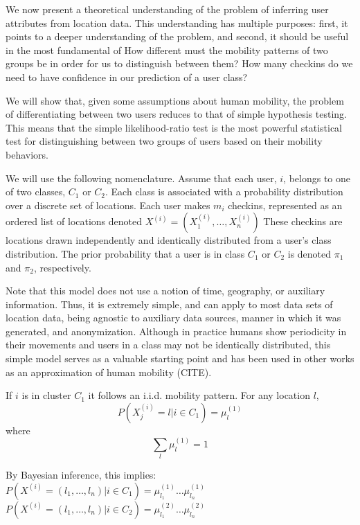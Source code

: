 We now present a theoretical understanding of the problem of inferring user attributes from location data.
This understanding has multiple purposes: first, it points to a deeper understanding of the problem, and second, it should be useful in the most fundamental of 
How different must the mobility patterns of two groups be in order for us to distinguish between them?
How many checkins do we need to have confidence in our prediction of a user class?

We will show that, given some assumptions about human mobility, the problem of differentiating between two users reduces to that of simple hypothesis testing. This means that the simple likelihood-ratio test is the most powerful statistical test for distinguishing between two groups of users based on their mobility behaviors.

We will use the following nomenclature. 
Assume that each user, $i$, belongs to one of two classes, $C_1$ or $C_2$. 
Each class is associated with a probability distribution over a discrete set of locations.
Each user makes $m_i$ checkins, represented as an ordered list of locations denoted $X^{(i)}=(X^{(i)}_1,\ldots,X^{(i)}_n)$
These checkins are locations drawn independently and identically distributed from a user's class distribution.
The prior probability that a user is in class $C_1$ or $C_2$ is denoted $\pi_1$ and $\pi_2$, respectively.

Note that this model does not use a notion of time, geography, or auxiliary information.
Thus, it is extremely simple, and can apply to most data sets of location data, being agnostic to
  auxiliary data sources, manner in which it was generated, and anonymization.
Although in practice humans show periodicity in their movements and users in a class may not be 
  identically distributed, this simple model serves as a valuable starting point and 
  has been used in other works as an approximation of human mobility (CITE).

If $i$ is in cluster $C_1$ it follows an i.i.d. mobility pattern. 
For any location $l$, 
\[ P(X^{(i)}_j=l | i\in C_1)=\mu^{(1)}_l \]
where 
\[ \sum_{l} \mu^{(1)}_l=1 \]

By Bayesian inference, this implies: \\
$ P(X^{(i)} = (l_1,\ldots,l_n)|i \in C_1 ) = \mu^{(1)}_{l_1}  \ldots \mu^{(1)}_{l_n} $ \\
$ P(X^{(i)} = (l_1,\ldots,l_n)|i \in C_2 ) = \mu^{(2)}_{l_1}  \ldots \mu^{(2)}_{l_n} $ 


